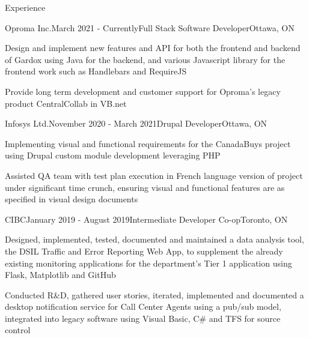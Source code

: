 \documentclass{resume} %
\begin{document}
\begin{rSection}{Experience}
\begin{rSubsection}{Oproma Inc.}{March 2021 - Currently}{Full Stack Software Developer}{Ottawa, ON}
\item Design and implement new features and API for both the frontend and backend of Gardox using Java for the backend, and various Javascript library for the frontend work such as Handlebars and RequireJS
\item Provide long term development and customer support for Oproma's legacy product CentralCollab in VB.net
\end{rSubsection}

\begin{rSubsection}{Infosys Ltd.}{November 2020 - March 2021}{Drupal Developer}{Ottawa, ON}
\item Implementing visual and functional requirements for the CanadaBuys project using Drupal custom module development leveraging PHP
\item Assisted QA team with test plan execution in French language version of project under significant time crunch, ensuring visual and functional features are as specified in visual design documents
\end{rSubsection}

\begin{rSubsection}{CIBC}{January 2019 - August 2019}{Intermediate Developer Co-op}{Toronto, ON}
\item Designed, implemented, tested, documented and maintained a data analysis tool, the DSIL Traffic and Error Reporting Web App, to supplement the already existing monitoring applications for the department’s Tier 1 application using Flask, Matplotlib and GitHub
\item Conducted R\&D, gathered user stories, iterated, implemented and documented a desktop notification service for Call Center Agents using a pub/sub model, integrated into legacy software using Visual Basic, C\# and TFS for source control
\end{rSubsection}



\end{rSection}
\end{document}
